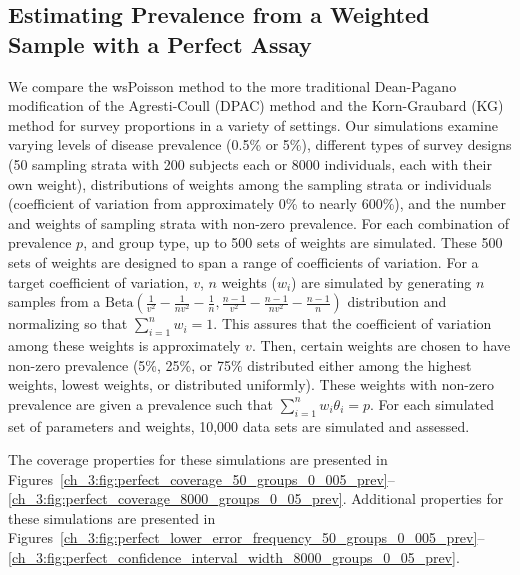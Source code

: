 \subsection{Estimating Prevalence from a Weighted Sample with a Perfect Assay}
\label{ch_3:sim-perfect}
We compare the wsPoisson method to the more traditional Dean-Pagano modification of the Agresti-Coull (DPAC) method and the Korn-Graubard (KG) method for survey proportions in a variety of settings.
Our simulations examine varying levels of disease prevalence (0.5\% or 5\%), different types of survey designs (50 sampling strata with 200 subjects each or 8000 individuals, each with their own weight), distributions of weights among the sampling strata or individuals (coefficient of variation from approximately 0\% to nearly 600\%), and the number and weights of sampling strata with non-zero prevalence.
For each combination of prevalence \( p \), and group type, up to 500 sets of weights are simulated.
These 500 sets of weights are designed to span a range of coefficients of variation.
For a target coefficient of variation, \( v \), \( n \) weights (\(w_i\)) are simulated by generating \( n \) samples from a \( \text{Beta} \left(\frac{1}{v^2} - \frac{1}{nv^2} - \frac{1}{n}, \frac{n-1}{v^2} - \frac{n-1}{nv^2} - \frac{n-1}{n} \right) \) distribution and normalizing so that \( \sum_{i=1}^n w_i = 1 \).
This assures that the coefficient of variation among these weights is approximately \( v \).
Then, certain weights are chosen to have non-zero prevalence (5\%, 25\%, or 75\% distributed either among the highest weights, lowest weights, or distributed uniformly).
These weights with non-zero prevalence are given a prevalence such that \( \sum_{i=1}^n w_i \theta_i = p \).
For each simulated set of parameters and weights, 10,000 data sets are simulated and assessed.

The coverage properties for these simulations are presented in Figures~\ref{ch_3:fig:perfect_coverage_50_groups_0_005_prev}--\ref{ch_3:fig:perfect_coverage_8000_groups_0_05_prev}.
Additional properties for these simulations are presented in Figures~\ref{ch_3:fig:perfect_lower_error_frequency_50_groups_0_005_prev}--\ref{ch_3:fig:perfect_confidence_interval_width_8000_groups_0_05_prev}.

